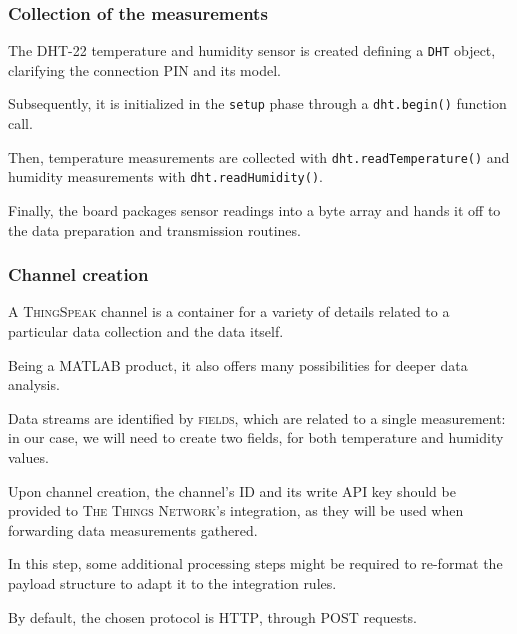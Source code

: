 \documentclass[a4paper,11pt]{article} %
\begin{document}
    \subsubsection{Collection of the measurements}

    The \textsc{DHT-22} temperature and humidity sensor is created defining a \texttt{DHT} object, clarifying the connection PIN and its model.

    \smallskip

    Subsequently, it is initialized in the \texttt{setup} phase through a \texttt{dht.begin()} function call.

    \medskip

    Then, temperature measurements are collected with \texttt{dht.readTemperature()} and humidity measurements with \texttt{dht.readHumidity()}.

    \smallskip

    Finally, the board packages sensor readings into a byte array and hands it off to the data preparation and transmission routines.

    \subsubsection{Channel creation}

    A \textsc{ThingSpeak} channel is a container for a variety of details related to a particular data collection and the data itself.

    \smallskip

    Being a \textsc{MATLAB} product, it also offers many possibilities for deeper data analysis.

    \smallskip

    Data streams are identified by \textsc{fields}, which are related to a single measurement: in our case, we will need to create two fields, for both temperature and humidity values.

    \smallskip

    Upon channel creation, the channel's ID and its write API key should be provided to \textsc{The Things Network}'s integration, as they will be used when forwarding data measurements gathered.

    \smallskip

    In this step, some additional processing steps might be required to re-format the payload structure to adapt it to the integration rules.

    \medskip

    By default, the chosen protocol is \textsc{HTTP}, through \textsc{POST} requests.
\end{document}
